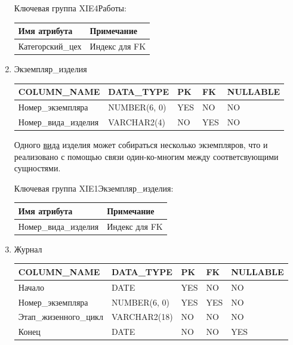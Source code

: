 \begin{enumerate}
    Ключевая группа XIE4Работы:

    \begin{tabular}{|p{7cm}|p{9.3cm}|} \hline

        {\bf Имя атрибута} & {\bf Примечание} \\ \hline
        Категорский\_цех & Индекс для FK \\ \hline

    \end{tabular}

    \item{Экземпляр\_изделия}

    \begin{tabular}{|p{7cm}|p{3cm}|p{1cm}|p{1cm}|p{3cm}|} \hline

        {\bf COLUMN\_NAME} & {\bf DATA\_TYPE} & {\bf PK} & {\bf FK} & {\bf NULLABLE} \\ \hline
        Номер\_экземпляра & NUMBER(6, 0) & YES & NO & NO \\ \hline
        Номер\_вида\_изделия & VARCHAR2(4) & NO & YES & NO \\ \hline

    \end{tabular}

    Одного \underline{вида} изделия может собираться несколько экземпляров, что и реализовано с помощью связи один-ко-многим между соответсвующими сущностями.

    Ключевая группа XIE1Экземпляр\_изделия:

    \begin{tabular}{|p{7cm}|p{9.3cm}|} \hline

        {\bf Имя атрибута} & {\bf Примечание} \\ \hline
        Номер\_вида\_изделия & Индекс для FK \\ \hline

    \end{tabular}

    \item{Журнал}

    \begin{tabular}{|p{7cm}|p{3cm}|p{1cm}|p{1cm}|p{3cm}|} \hline

        {\bf COLUMN\_NAME} & {\bf DATA\_TYPE} & {\bf PK} & {\bf FK} & {\bf NULLABLE} \\ \hline
        Начало & DATE & YES & NO & NO \\ \hline
        Номер\_экземпляра & NUMBER(6, 0) & YES & YES & NO \\ \hline
        Этап\_жизенного\_цикл & VARCHAR2(18) & NO & NO & NO \\ \hline
        Конец & DATE & NO & NO & YES \\ \hline


\end{tabular}
\end{enumerate}

